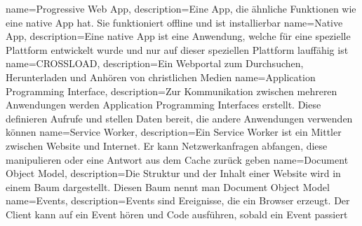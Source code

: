 {
        name=Progressive Web App,
        description={Eine App, die ähnliche Funktionen wie eine native App hat. Sie funktioniert offline und ist installierbar}
}
{
        name=Native App,
        description={Eine native App ist eine Anwendung, welche für eine spezielle Plattform entwickelt wurde und nur auf dieser speziellen Plattform lauffähig ist}
}
{
        name=CROSSLOAD,
        description={Ein Webportal zum Durchsuchen, Herunterladen und Anhören von christlichen Medien}
}
{
        name=Application Programming Interface,
        description={Zur Kommunikation zwischen mehreren Anwendungen werden Application Programming Interfaces erstellt. Diese definieren Aufrufe und stellen Daten bereit, die andere Anwendungen verwenden können}
}
{
        name=Service Worker,
        description={Ein Service Worker ist ein Mittler zwischen Website und Internet. Er kann Netzwerkanfragen abfangen, diese manipulieren oder eine Antwort aus dem Cache zurück geben}
}
{
        name=Document Object Model,
        description={Die Struktur und der Inhalt einer Website wird in einem Baum dargestellt. Diesen Baum nennt man Document Object Model}
}
{
        name=Events,
        description={Events sind Ereignisse, die ein Browser erzeugt. Der Client kann auf ein Event hören und Code ausführen, sobald ein Event passiert}
}